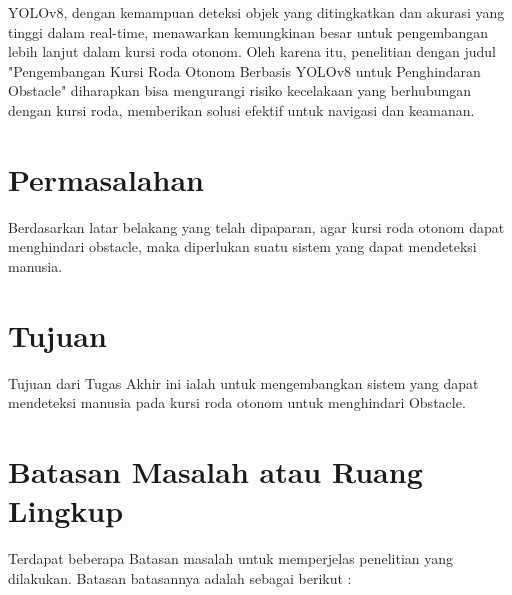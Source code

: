YOLOv8, dengan kemampuan deteksi objek yang ditingkatkan dan akurasi yang tinggi dalam real-time, menawarkan kemungkinan besar untuk pengembangan lebih lanjut dalam kursi roda otonom. Oleh karena itu, penelitian dengan judul "Pengembangan Kursi Roda Otonom Berbasis YOLOv8 untuk Penghindaran Obstacle" diharapkan bisa mengurangi risiko kecelakaan yang berhubungan dengan kursi roda, memberikan solusi efektif untuk navigasi dan keamanan.


\section{Permasalahan}
\label{sec:permasalahan}

Berdasarkan latar belakang yang telah dipaparan, agar kursi roda otonom dapat menghindari obstacle, maka diperlukan suatu sistem yang dapat mendeteksi manusia.

\section{Tujuan}
\label{sec:Tujuan}

Tujuan dari Tugas Akhir ini ialah untuk mengembangkan sistem yang dapat mendeteksi manusia pada kursi roda otonom untuk menghindari Obstacle.

\section{Batasan Masalah atau Ruang Lingkup}

Terdapat beberapa Batasan masalah untuk memperjelas penelitian yang dilakukan. Batasan batasannya adalah sebagai berikut :

